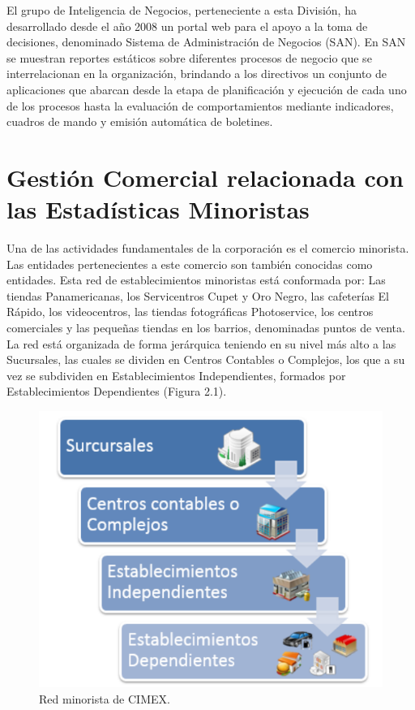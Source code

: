 El grupo de Inteligencia de Negocios, perteneciente a esta División, ha desarrollado desde el año 2008 un portal web para el apoyo a la toma de decisiones, denominado Sistema de Administración de Negocios (SAN). En SAN se muestran reportes estáticos sobre diferentes procesos de negocio que se interrelacionan en la organización, brindando a los directivos un conjunto de aplicaciones que abarcan desde la etapa de planificación y ejecución de cada uno de los procesos hasta la evaluación de comportamientos mediante indicadores, cuadros de mando y emisión automática de boletines.



\section*{Gestión Comercial relacionada con las Estadísticas Minoristas}\label{gestion_comercial}
Una de las actividades fundamentales de la corporación es el comercio minorista. Las entidades pertenecientes a este comercio son también conocidas como entidades. Esta red de establecimientos  minoristas está conformada por: Las tiendas Panamericanas, los Servicentros Cupet y Oro Negro, las cafeterías El Rápido, los videocentros, las tiendas fotográficas Photoservice, los centros comerciales y las pequeñas tiendas en los barrios, denominadas puntos de venta.\\

La red está organizada de forma jerárquica teniendo en su nivel más alto a las Sucursales, las cuales se dividen en Centros Contables o Complejos, los que a su vez se subdividen en Establecimientos Independientes, formados por Establecimientos Dependientes (Figura 2.1).


\begin{figure}[ht]
  \begin{center}
    \includegraphics[scale=0.4]{Graphics/figura2_1.png}
    \caption{Red minorista de CIMEX.}
    \label{fig:red minorista}
  \end{center}
\end{figure}

